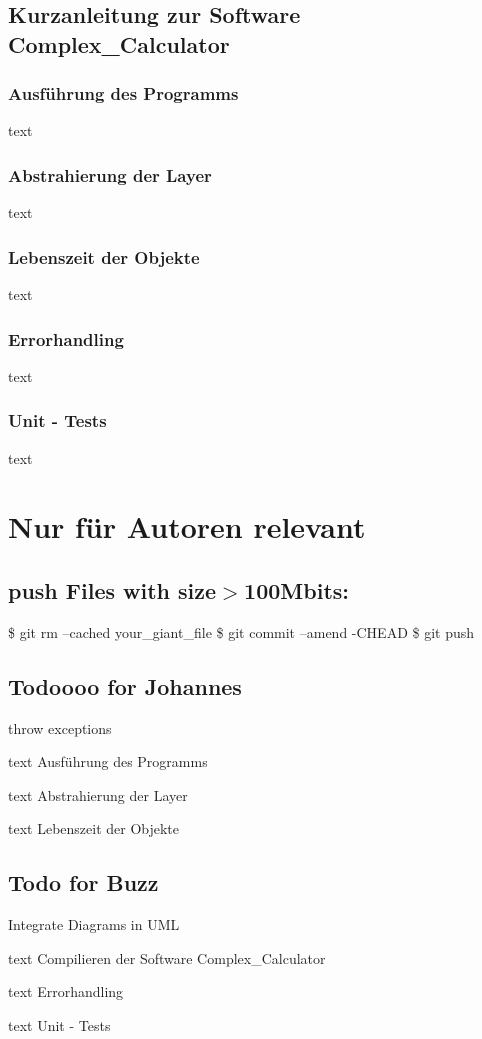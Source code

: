 \subsection*{Kurzanleitung zur Software Complex\+\_\+\+Calculator}

\subsubsection*{Ausführung des Programms}

text \subsubsection*{Abstrahierung der Layer}

text \subsubsection*{Lebenszeit der Objekte}

text \subsubsection*{Errorhandling}

text \subsubsection*{Unit -\/ Tests}

text

\section*{Nur für Autoren relevant}

\subsection*{push Files with size$>$100\+Mbits\+:}

\$ git rm --cached your\+\_\+giant\+\_\+file \$ git commit --amend -\/\+C\+H\+E\+AD \$ git push

\subsection*{Todoooo for Johannes}


\begin{DoxyItemize}
\item throw exceptions
\item text Ausführung des Programms
\item text Abstrahierung der Layer
\item text Lebenszeit der Objekte
\end{DoxyItemize}

\subsection*{Todo for Buzz}


\begin{DoxyItemize}
\item Integrate Diagrams in U\+ML
\item text Compilieren der Software Complex\+\_\+\+Calculator
\item text Errorhandling
\item text Unit -\/ Tests 
\end{DoxyItemize}